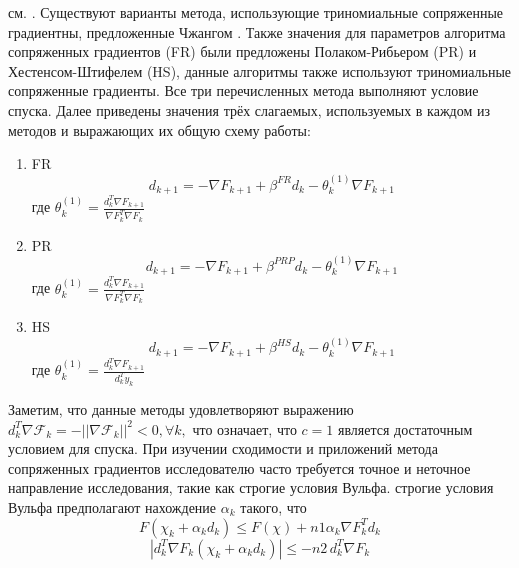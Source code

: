 см. \cite{art8,art9,art10,art11,art12,art13,art14,art15}. Существуют варианты
метода, использующие триномиальные сопряженные градиентны, предложенные Чжангом
\cite{art16}. Также значения для параметров алгоритма сопряженных градиентов
(FR) были предложены Полаком-Рибьером (PR) и Хестенсом-Штифелем (HS), данные
алгоритмы также используют триномиальные сопряженные градиенты. Все три
перечисленных метода выполняют условие спуска. Далее приведены значения трёх
слагаемых, используемых в каждом из методов и выражающих их общую схему работы:

\begin{enumerate}
    \item FR
    \begin{equation*}
        d_{k+1}=-\nabla F_{k+1}+\beta^{F R}d_{k}-\theta_{k}^{(1)}\nabla F_{k+1}
    \end{equation*}
    где $ \theta_{k}^{(1)}=\frac{d_{k}^{T}\nabla F_{k+1}}{\nabla F_{k}^{T}\nabla F_{k}} $
    \item PR
    \begin{equation*}
        d_{k+1}=-\nabla F_{k+1}+\beta^{P R P}d_{k}-\theta_{k}^{(1)}\nabla F_{k+1}
    \end{equation*}
    где $\theta_{k}^{(1)}=\frac{d_{k}^{T}\nabla F_{k+1}}{\nabla F_{k}^{T}\nabla F_{k}}$
    \item HS
    \begin{equation*}
        d_{k+1}=-\nabla F_{k+1}+\beta^{H S}d_{k}-\theta_{k}^{(1)}\nabla F_{k+1}
    \end{equation*}
    где $ \theta_{k}^{(1)}=\frac{d_{k}^{T}\nabla F_{k+1}}{d_{k}^{T}y_{k}} $
\end{enumerate}

Заметим, что данные методы удовлетворяют выражению $d_{k}^{T}\mathcal{\nabla
F}_{k}=-||\mathcal{\nabla F}_{k}||^{2}<0,\forall k,$ что означает, что $c = 1$
является достаточным условием для спуска. При изучении сходимости и приложений
метода сопряженных градиентов исследователю часто требуется точное и неточное
направление исследования, такие как строгие условия Вульфа. строгие условия
Вульфа предполагают нахождение $\alpha_{k}$ такого, что
\begin{equation}\label{eqn:eq5}
    F(\chi_{k}+\alpha_{k}d_{k})\leq F(\chi) + n1 \alpha_{k} \nabla F_{k}^{T}d_{k}
\end{equation}
\begin{equation}\label{eqn:eq6}
    |d_{k}^{T}\nabla F_{k}(\chi_{k}+\alpha_{k}d_{k})|\leq-n2\,d_{k}^{T}\nabla F_{k}
\end{equation}

